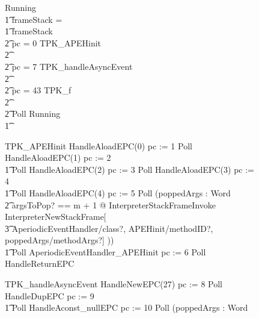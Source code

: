 \begin{figure}[p!]
  \setlength{\zedindent}{0cm}
  \setlength{\zedtab}{0.5cm}
  \setlength{\zedleftsep}{0.1cm}
  \begin{circus}
    Running \circdef \\
    \t1 \circif frameStack = \emptyset \circthen \Skip \\
    \t1 {} \circelse frameStack \neq \emptyset \circthen {} \\
    \t2 {} \circif pc = 0 \circthen TPK\_APEHinit \\
    \t2 {} \cdots {} \\
    \t2 {} \circelse pc = 7 \circthen TPK\_handleAsyncEvent \\
    \t2 {} \cdots {} \\
    \t2 {} \circelse pc = 43 \circthen TPK\_f \\
    \t2 {} \cdots {} \\
    \t2 \circfi \circseq Poll \circseq Running \\
    \t1 \circfi
  \end{circus}
  \vspace{-1cm}
  \begin{circus}
    TPK\_APEHinit \circdef HandleAloadEPC(0) \circseq pc := 1 \circseq Poll \circseq HandleAloadEPC(1) \circseq pc := 2 \circseq \\
    \t1 Poll \circseq HandleAloadEPC(2) \circseq pc := 3 \circseq Poll \circseq HandleAloadEPC(3) \circseq pc := 4 \circseq \\
    \t1 Poll \circseq HandleAloadEPC(4) \circseq pc := 5 \circseq Poll \circseq (\circvar poppedArgs : \seq Word \circspot \\
    \t2 \lschexpract \exists argsToPop? == m + 1 @ InterpreterStackFrameInvoke \rschexpract \circseq \lschexpract InterpreterNewStackFrame[\\
    \t3 AperiodicEventHandler/class?, APEHinit/methodID?, poppedArgs/methodArgs?] \rschexpract)) \circseq \\
    \t1 Poll \circseq AperiodicEventHandler\_APEHinit \circseq pc := 6 \circseq Poll \circseq HandleReturnEPC \\
  \end{circus}
  \vspace{-1cm}
  \begin{circus}
    TPK\_handleAsyncEvent \circdef HandleNewEPC(27) \circseq pc := 8 \circseq Poll \circseq HandleDupEPC \circseq pc := 9 \circseq \\
    \t1 Poll \circseq HandleAconst\_nullEPC \circseq pc := 10 \circseq Poll \circseq (\circvar poppedArgs : \seq Word \circspot \\

\end{circus}
\end{figure}
